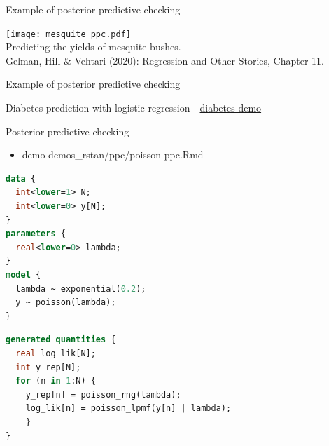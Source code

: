 \documentclass[t]{beamer}
\begin{document}
\begin{frame}[fragile]

  {\Large\color{navyblue} Example of posterior predictive checking}
  
    \texttt{[image: mesquite\_ppc.pdf]}\\
  \vspace{-0.1\baselineskip} {Predicting the yields of mesquite bushes.\\
    \color{gray} \footnotesize
    Gelman, Hill \& Vehtari (2020): Regression and Other Stories, Chapter 11.}\\

\end{frame}

\begin{frame}[fragile]

  {\Large\color{navyblue} Example of posterior predictive checking}

  Diabetes prediction with logistic regression -
  \href{https://avehtari.github.io/modelselection/diabetes.html}{diabetes demo}
  

\end{frame}

\begin{frame}[fragile]

  {\Large\color{navyblue} Posterior predictive checking}

  \vspace{-0.2\parskip}
  \begin{itemize}
  \item demo demos\_rstan/ppc/poisson-ppc.Rmd
  \end{itemize}

  \vspace{-0.2\parskip}
  {\color{gray}\footnotesize
\begin{lstlisting}[language=Stan]
data {
  int<lower=1> N;
  int<lower=0> y[N];
}
parameters {
  real<lower=0> lambda;
}
model {
  lambda ~ exponential(0.2);
  y ~ poisson(lambda);
}
\end{lstlisting}
  }
  \vspace{-\parskip}
  {\footnotesize
\begin{lstlisting}[language=Stan]
generated quantities {
  real log_lik[N];
  int y_rep[N];
  for (n in 1:N) {
    y_rep[n] = poisson_rng(lambda);
    log_lik[n] = poisson_lpmf(y[n] | lambda);
    }
}
\end{lstlisting}
 }
\end{frame}
\end{document}
